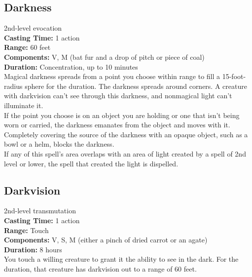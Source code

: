 \documentclass[11pt, A4paper, english]{article}
\begin{document}
		\subsection{Darkness}
2nd-level evocation \\
\textbf{Casting Time:} 1 action \\
\textbf{Range:} 60 feet \\
\textbf{Components:} V, M (bat fur and a drop of pitch or piece of coal) \\
\textbf{Duration:} Concentration, up to 10 minutes \\
Magical darkness spreads from a point you choose within range to fill a 15-foot-radius sphere for the duration. The darkness spreads around corners. A creature with darkvision can’t see through this darkness, and nonmagical light can’t illuminate it. \\
If the point you choose is on an object you are holding or one that isn’t being worn or carried, the darkness emanates from the object and moves with it. Completely covering the source of the darkness with an opaque object, such as a bowl or a helm, blocks the darkness. \\
If any of this spell’s area overlaps with an area of light created by a spell of 2nd level or lower, the spell that created the light is dispelled.

		\subsection{Darkvision}
2nd-level transmutation \\
\textbf{Casting Time:} 1 action \\
\textbf{Range:} Touch \\
\textbf{Components:} V, S, M (either a pinch of dried carrot or an agate) \\
\textbf{Duration:} 8 hours \\
You touch a willing creature to grant it the ability to see in the dark. For the duration, that creature has darkvision out to a range of 60 feet.
\end{document}
